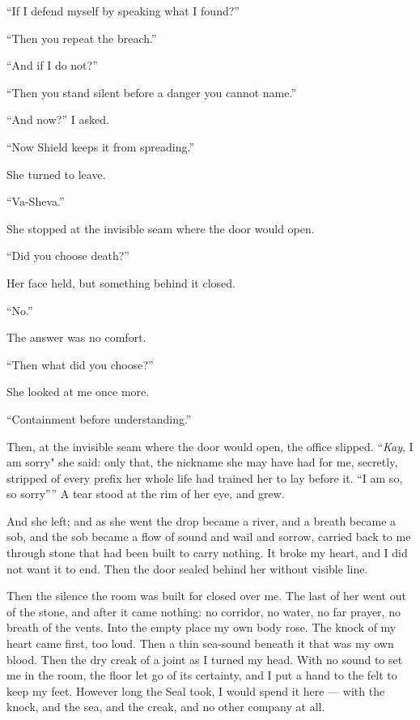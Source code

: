``If I defend myself by speaking what I found?''\par

``Then you repeat the breach.''\par

``And if I do not?''\par

``Then you stand silent before a danger you cannot name.''\par

``And now?'' I asked.\par

``Now Shield keeps it from spreading.''\par

She turned to leave.\par

``Va-Sheva.''\par

She stopped at the invisible seam where the door would open.\par

``Did you choose death?''\par

Her face held, but something behind it closed.\par

``No.''\par

The answer was no comfort.\par

``Then what did you choose?''\par

She looked at me once more.\par

``Containment before understanding.''\par

Then, at the invisible seam where the door would open, the office slipped. ``\textit{Kay}, I am sorry" she said: only that, the nickname she may have had for me, secretly, stripped of every prefix her whole life had trained her to lay before it. ``I am so, so sorry'''' A tear stood at the rim of her eye, and grew.\par

And she left; and as she went the drop became a river, and a breath became a sob, and the sob became a flow of sound and wail and sorrow, carried back to me through stone that had been built to carry nothing. It broke my heart, and I did not want it to end. Then the door sealed behind her without visible line.\par

Then the silence the room was built for closed over me. The last of her went out of the stone, and after it came nothing: no corridor, no water, no far prayer, no breath of the vents. Into the empty place my own body rose. The knock of my heart came first, too loud. Then a thin sea-sound beneath it that was my own blood. Then the dry creak of a joint as I turned my head. With no sound to set me in the room, the floor let go of its certainty, and I put a hand to the felt to keep my feet. However long the Seal took, I would spend it here --- with the knock, and the sea, and the creak, and no other company at all.\par

\ornament
